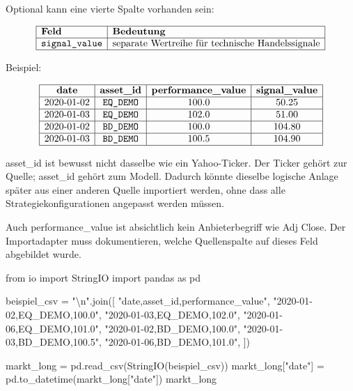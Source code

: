 \documentclass[
  ngerman,
  a4paper,
  DIV=11,
  oneside]{scrreprt}
\newenvironment{Shaded}{\begin{snugshade}}{\end{snugshade}}
\newcommand{\CharTok}[1]{\textcolor[rgb]{0.13,0.47,0.30}{#1}}
\newcommand{\ImportTok}[1]{\textcolor[rgb]{0.00,0.46,0.62}{#1}}
\newcommand{\NormalTok}[1]{\textcolor[rgb]{0.00,0.23,0.31}{#1}}
\newcommand{\OperatorTok}[1]{\textcolor[rgb]{0.37,0.37,0.37}{#1}}
\newcommand{\StringTok}[1]{\textcolor[rgb]{0.13,0.47,0.30}{#1}}
\begin{document}
Optional kann eine vierte Spalte vorhanden sein:

\[
\begin{array}{|l|l|}
\hline
\textbf{Feld} & \textbf{Bedeutung} \\
\hline
\texttt{signal\_value} & \text{separate Wertreihe für technische Handelssignale} \\
\hline
\end{array}
\]

Beispiel:

\[
\begin{array}{|c|c|c|c|}
\hline
\textbf{date} & \textbf{asset\_id} & \textbf{performance\_value} & \textbf{signal\_value} \\
\hline
2020\text{-}01\text{-}02 & \texttt{EQ\_DEMO} & 100.0 & 50.25 \\
\hline
2020\text{-}01\text{-}03 & \texttt{EQ\_DEMO} & 102.0 & 51.00 \\
\hline
2020\text{-}01\text{-}02 & \texttt{BD\_DEMO} & 100.0 & 104.80 \\
\hline
2020\text{-}01\text{-}03 & \texttt{BD\_DEMO} & 100.5 & 104.90 \\
\hline
\end{array}
\]

asset\_id ist bewusst nicht dasselbe wie ein Yahoo-Ticker. Der Ticker
gehört zur Quelle; asset\_id gehört zum Modell. Dadurch könnte dieselbe
logische Anlage später aus einer anderen Quelle importiert werden, ohne
dass alle Strategiekonfigurationen angepasst werden müssen.

Auch performance\_value ist absichtlich kein Anbieterbegriff wie Adj
Close. Der Importadapter muss dokumentieren, welche Quellenspalte auf
dieses Feld abgebildet wurde.

\begin{Shaded}
\begin{Highlighting}[]
\ImportTok{from}\NormalTok{ io }\ImportTok{import}\NormalTok{ StringIO}
\ImportTok{import}\NormalTok{ pandas }\ImportTok{as}\NormalTok{ pd}

\NormalTok{beispiel\_csv }\OperatorTok{=} \StringTok{"}\CharTok{\textbackslash{}n}\StringTok{"}\NormalTok{.join([}
    \StringTok{"date,asset\_id,performance\_value"}\NormalTok{,}
    \StringTok{"2020{-}01{-}02,EQ\_DEMO,100.0"}\NormalTok{,}
    \StringTok{"2020{-}01{-}03,EQ\_DEMO,102.0"}\NormalTok{,}
    \StringTok{"2020{-}01{-}06,EQ\_DEMO,101.0"}\NormalTok{,}
    \StringTok{"2020{-}01{-}02,BD\_DEMO,100.0"}\NormalTok{,}
    \StringTok{"2020{-}01{-}03,BD\_DEMO,100.5"}\NormalTok{,}
    \StringTok{"2020{-}01{-}06,BD\_DEMO,101.0"}\NormalTok{,}
\NormalTok{])}

\NormalTok{markt\_long }\OperatorTok{=}\NormalTok{ pd.read\_csv(StringIO(beispiel\_csv))}
\NormalTok{markt\_long[}\StringTok{"date"}\NormalTok{] }\OperatorTok{=}\NormalTok{ pd.to\_datetime(markt\_long[}\StringTok{"date"}\NormalTok{])}
\NormalTok{markt\_long}
\end{Highlighting}
\end{Shaded}
\end{document}
